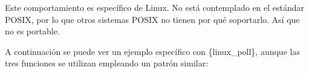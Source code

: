 Este comportamiento es específico de Linux. No está contemplado en el
estándar POSIX, por lo que otros sistemas POSIX no tienen por qué
soportarlo. Así que no es portable.

A continuación se puede ver un ejemplo específico con \{linux\_poll\},
aunque las tres funciones se utilizan empleando un patrón similar:

\begin{Shaded}
\begin{Highlighting}[]
\OperatorTok{=}\OperatorTok{(} \OperatorTok{,}  \OperatorTok{);} 
\OperatorTok{=}\OperatorTok{(} \OperatorTok{,}  \OperatorTok{);}

\OperatorTok{[]} \OperatorTok{=}
\OperatorTok{\{}
    \OperatorTok{\{}
        \OperatorTok{=}\OperatorTok{,} 
        \OperatorTok{=}\OperatorTok{,} 
        \OperatorTok{=} 
    \OperatorTok{\},} \OperatorTok{\{}
        \OperatorTok{=}\OperatorTok{,} 
        \OperatorTok{=}\OperatorTok{|}\OperatorTok{,} 
        \OperatorTok{=} 
    \OperatorTok{\}}
\OperatorTok{\};}

 \OperatorTok{(} \OperatorTok{!}\OperatorTok{)}
\OperatorTok{\{}
    \OperatorTok{=}\OperatorTok{(}\OperatorTok{,} \OperatorTok{,} \OperatorTok{{-}} \OperatorTok{);} 
     \OperatorTok{(}\OperatorTok{\textgreater{}} \OperatorTok{)} 
    \OperatorTok{\{}
         \OperatorTok{(}\OperatorTok{[}\OperatorTok{].}\OperatorTok{\&}\OperatorTok{)} 
        \OperatorTok{\{}
\OperatorTok{(}\OperatorTok{[}\OperatorTok{].}\OperatorTok{,}  \OperatorTok{);}

        \OperatorTok{\}}


\end{Highlighting}
\end{Shaded}

